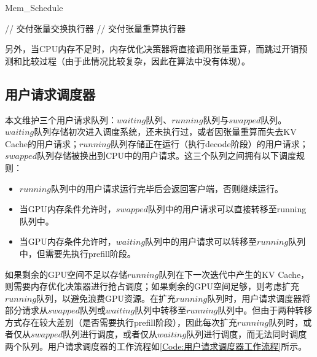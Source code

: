 \begin{algorithm}
  \caption{Mem\_Schedule}
  \label{Code:内存优化决策器工作流程}
  \small
  \begin{spacing}{1.2}
    \begin{algorithmic}[1]
           \hfill {// 交付张量交换执行器}
        \ELSE
           \hfill {// 交付张量重算执行器}
        \ENDIF
      \ENDWHILE
    \end{algorithmic}
  \end{spacing}
\end{algorithm}

另外，当CPU内存不足时，内存优化决策器将直接调用张量重算，而跳过开销预测和比较过程（由于此情况比较复杂，因此在算法中没有体现）。

\subsection{用户请求调度器}
本文维护三个用户请求队列：$waiting$队列、$running$队列与$swapped$队列。$waiting$队列存储初次进入调度系统，还未执行过，或者因张量重算而失去KV Cache的用户请求；$running$队列存储正在运行（执行decode阶段）的用户请求；$swapped$队列存储被换出到CPU中的用户请求。这三个队列之间拥有以下调度规则：

\begin{itemize}
  \item $running$队列中的用户请求运行完毕后会返回客户端，否则继续运行。
  \item 当GPU内存条件允许时，$swapped$队列中的用户请求可以直接转移至running队列中。
  \item 当GPU内存条件允许时，$waiting$队列中的用户请求可以转移至$running$队列中，但需要先执行prefill阶段。
\end{itemize}

如果剩余的GPU空间不足以存储$running$队列在下一次迭代中产生的KV Cache，则需要内存优化决策器进行抢占调度；如果剩余的GPU空间足够，则考虑扩充$running$队列，以避免浪费GPU资源。在扩充$running$队列时，用户请求调度器将部分请求从$swapped$队列或$waiting$队列中转移至$running$队列中。但由于两种转移方式存在较大差别（是否需要执行prefill阶段），因此每次扩充$running$队列时，或者仅从$swapped$队列进行调度，或者仅从$waiting$队列进行调度，而无法同时调度两个队列。用户请求调度器的工作流程如\ref{Code:用户请求调度器工作流程}所示。

